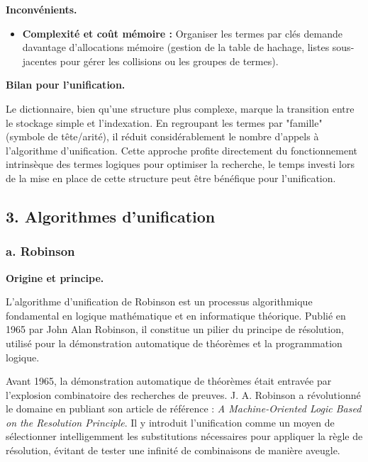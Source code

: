\documentclass[11pt]{article}
\begin{document}
\vspace{0.4cm}
\noindent\textbf{Inconvénients.}

\begin{itemize}
    \item \textbf{Complexité et coût mémoire :} Organiser les termes par clés demande davantage d'allocations mémoire (gestion de la table de hachage, listes sous-jacentes pour gérer les collisions ou les groupes de termes).
\end{itemize}

\vspace{0.4cm}
\noindent\textbf{Bilan pour l'unification.}

\vspace{0.2cm}
Le dictionnaire, bien qu'une structure plus complexe,  marque la transition entre le stockage simple et l'indexation. En regroupant les termes par "famille" (symbole de tête/arité), il réduit considérablement le nombre d'appels à l'algorithme d'unification. Cette approche profite directement du fonctionnement intrinsèque des termes logiques pour optimiser la recherche, le temps investi lors de la mise en place de cette structure peut être bénéfique pour l'unification.

\newpage
\subsection*{3. Algorithmes d'unification}
\label{algo_unif}

\subsubsection*{\hspace{4em}a. Robinson}
\label{robinson}

\vspace{0.4cm}
\noindent\textbf{Origine et principe.}

\vspace{0.2cm}
L'algorithme d'unification de Robinson est un processus algorithmique fondamental en logique mathématique et en informatique théorique. Publié en 1965 par John Alan Robinson, il constitue un pilier du principe de résolution, utilisé pour la démonstration automatique de théorèmes et la programmation logique.

Avant 1965, la démonstration automatique de théorèmes était entravée par l'explosion combinatoire des recherches de preuves. J. A. Robinson a révolutionné le domaine en publiant son article de référence : \textit{A Machine-Oriented Logic Based on the Resolution Principle}. Il y introduit l'unification comme un moyen de sélectionner intelligemment les substitutions nécessaires pour appliquer la règle de résolution, évitant de tester une infinité de combinaisons de manière aveugle.
\end{document}
